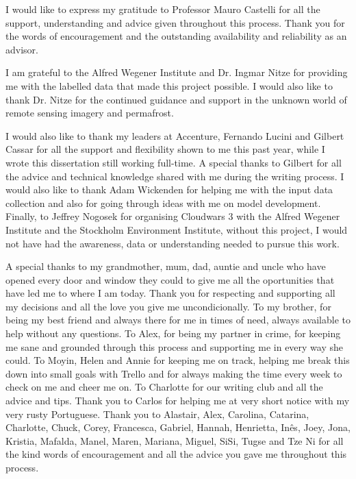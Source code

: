 

\begin{ntacknowledgements}

I would like to express my gratitude to Professor Mauro Castelli for all the support, understanding and advice given throughout this process. Thank you for the words of encouragement and the outstanding availability and reliability as an advisor.

I am grateful to the Alfred Wegener Institute and Dr. Ingmar Nitze for providing me with the labelled data that made this project possible. I would also like to thank Dr. Nitze for the continued guidance and support in the unknown world of remote sensing imagery and permafrost.

I would also like to thank my leaders at Accenture, Fernando Lucini and Gilbert Cassar for all the support and flexibility shown to me this past year, while I wrote this dissertation still working full-time. A special thanks to Gilbert for all the advice and technical knowledge shared with me during the writing process. I would also like to thank Adam Wickenden for helping me with the input data collection and also for going through ideas with me on model development. Finally, to Jeffrey Nogosek for organising Cloudwars 3 with the Alfred Wegener Institute and the Stockholm Environment Institute, without this project, I would not have had the awareness, data or understanding needed to pursue this work.

A special thanks to my grandmother, mum, dad, auntie and uncle who have opened every door and window they could to give me all the oportunities that have led me to where I am today. Thank you for respecting and supporting all my decisions and all the love you give me uncondicionally. To my brother, for being my best friend and always there for me in times of need, always available to help without any questions. To Alex, for being my partner in crime, for keeping me sane and grounded through this process and supporting me in every way she could. To Moyin, Helen and Annie for keeping me on track, helping me break this down into small goals with Trello and for always making the time every week to check on me and cheer me on. To Charlotte for our writing club and all the advice and tips. Thank you to Carlos for helping me at very short notice with my very rusty Portuguese. Thank you to Alastair, Alex, Carolina, Catarina, Charlotte, Chuck, Corey, Francesca, Gabriel, Hannah, Henrietta, Inês, Joey, Jona, Kristia, Mafalda, Manel, Maren, Mariana, Miguel, SiSi, Tugse and Tze Ni for all the kind words of encouragement and all the advice you gave me throughout this process.


\end{ntacknowledgements}
